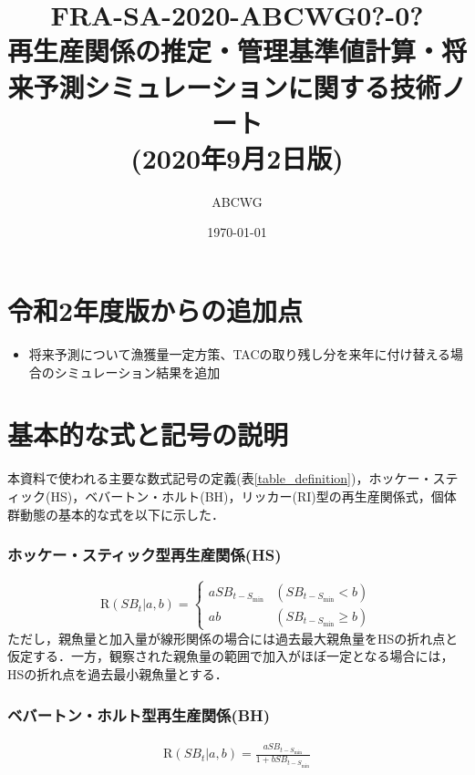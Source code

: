 \documentclass[11pt]{jsarticle}
\begin{document}
\title{{\normalsize FRA-SA-2020-ABCWG0?-0?}\\
  再生産関係の推定・管理基準値計算・将来予測シミュレーションに関する技術ノート \\
  \Large (2020年9月2日版)
}
\author{ABCWG}
\date{\today}
\maketitle

\section{令和2年度版からの追加点}
\begin{itemize}
\item 将来予測について漁獲量一定方策、TACの取り残し分を来年に付け替える場合のシミュレーション結果を追加
\end{itemize}

\section{基本的な式と記号の説明}
本資料で使われる主要な数式記号の定義(表\ref{table_definition})，ホッケー・スティック(HS)\cite{hockey}，ベバートン・ホルト(BH)\cite{beverton}，リッカー(RI)\cite{ricker}型の再生産関係式，個体群動態の基本的な式を以下に示した． 

\subsubsection*{ホッケー・スティック型再生産関係(HS)}
\begin{equation}
  \mathrm{R}(S\!B_{t}|a,b)=\begin{cases}
    a  S\!B_{t-S_{\mathrm{min}}} & (S\!B_{t-S_{\mathrm{min}}} < b) \\
    a  b                 & (S\!B_{t-S_{\mathrm{min}}} \geq b)
  \end{cases}
  \label{HS}
\end{equation}
ただし，親魚量と加入量が線形関係の場合には過去最大親魚量をHSの折れ点と仮定する．一方，観察された親魚量の範囲で加入がほぼ一定となる場合には，HSの折れ点を過去最小親魚量とする．

\subsubsection*{ベバートン・ホルト型再生産関係(BH)}
\begin{eqnarray}
  \mathrm{R}(S\!B_{t}|a,b)=\frac{a S\!B_{t-S_{\mathrm{min}}}}{1 + b S\!B_{t-S_{\mathrm{min}}}}
  \label{BH1}
\end{eqnarray}
\end{document}
